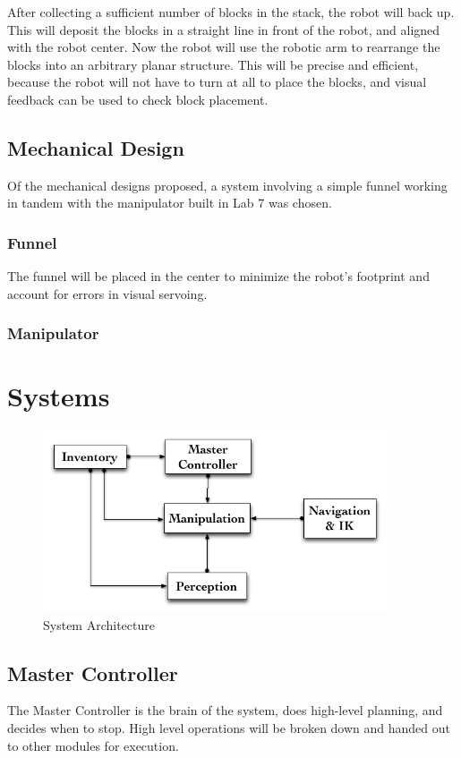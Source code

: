 \documentclass[letterpaper,11pt]{article}
\begin{document}
After collecting a sufficient number of blocks in the stack, the robot will back up.
This will deposit the blocks in a straight line in front of the robot, and aligned with the robot center.
Now the robot will use the robotic arm to rearrange the blocks into an arbitrary planar structure.
This will be precise and efficient, because the robot will not have to turn at all to place the blocks,
and visual feedback can be used to check block placement.

\subsection{Mechanical Design}
Of the mechanical designs proposed, a system involving a simple funnel working in tandem with the manipulator built in Lab 7 was chosen. 
\subsubsection{Funnel}
The funnel will be placed in the center to minimize the robot's footprint and account for errors in visual servoing.  
\subsubsection{Manipulator}

\section{Systems}
\begin{figure}[h]
\centering
 \includegraphics[width=4in]{images/System_Architecture}
\caption{System Architecture}
\end{figure}

\subsection{Master Controller}
The Master Controller is the brain of the system, does high-level planning, and decides when to stop.
High level operations will be broken down and handed out to other modules for execution.
\end{document}
